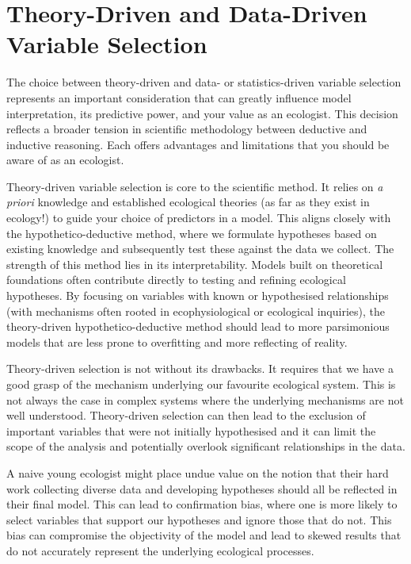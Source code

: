 \documentclass[
  letterpaper,
]{book}
\begin{document}
\section{Theory-Driven and Data-Driven Variable
Selection}\label{theory-driven-and-data-driven-variable-selection}

The choice between theory-driven and data- or statistics-driven variable
selection represents an important consideration that can greatly
influence model interpretation, its predictive power, and your value as
an ecologist. This decision reflects a broader tension in scientific
methodology between deductive and inductive reasoning. Each offers
advantages and limitations that you should be aware of as an ecologist.

Theory-driven variable selection is core to the scientific method. It
relies on \emph{a priori} knowledge and established ecological theories
(as far as they exist in ecology!) to guide your choice of predictors in
a model. This aligns closely with the hypothetico-deductive method,
where we formulate hypotheses based on existing knowledge and
subsequently test these against the data we collect. The strength of
this method lies in its interpretability. Models built on theoretical
foundations often contribute directly to testing and refining ecological
hypotheses. By focusing on variables with known or hypothesised
relationships (with mechanisms often rooted in ecophysiological or
ecological inquiries), the theory-driven hypothetico-deductive method
should lead to more parsimonious models that are less prone to
overfitting and more reflecting of reality.

Theory-driven selection is not without its drawbacks. It requires that
we have a good grasp of the mechanism underlying our favourite
ecological system. This is not always the case in complex systems where
the underlying mechanisms are not well understood. Theory-driven
selection can then lead to the exclusion of important variables that
were not initially hypothesised and it can limit the scope of the
analysis and potentially overlook significant relationships in the data.

A naive young ecologist might place undue value on the notion that their
hard work collecting diverse data and developing hypotheses should all
be reflected in their final model. This can lead to confirmation bias,
where one is more likely to select variables that support our hypotheses
and ignore those that do not. This bias can compromise the objectivity
of the model and lead to skewed results that do not accurately represent
the underlying ecological processes.
\end{document}
